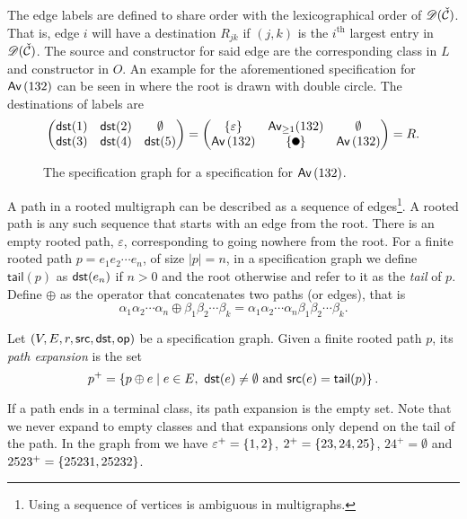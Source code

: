 The edge labels are defined to share order with the lexicographical order of $\mathscr{D}(\check{\mathcal{C}})$. That is, edge $i$ will have a destination $R_{jk}$ if $(j,k)$ is the $i^\text{th}$ largest entry in $\mathscr{D}(\check{\mathcal{C}})$. The source and constructor for said edge are the corresponding class in $L$ and constructor in $O$. An example for the aforementioned specification for $\textsf{Av}\left(132\right)$ can be seen in  where the root is drawn with double circle. The destinations of labels are
\[
    \begin{pmatrix}
        \dst(1) & \dst(2) & \emptyset\\
        \dst(3) & \dst(4) & \dst(5)
    \end{pmatrix}
    =
    \begin{pmatrix}
    \set{\varepsilon} & \textsf{Av}_{\geq1}(132) & \emptyset \\
    \Av{132} & \set{\point{0.1}} & \Av{132}
    \end{pmatrix}
    = R.
\]

\begin{figure}[ht!]
    \centering
    
    \caption{The specification graph for a specification for $\textsf{Av}\left(132\right)$.}
    \label{fig:specgraph132}
\end{figure}

A path in a rooted multigraph can be described as a sequence of edges\footnote{Using a sequence of vertices is ambiguous in multigraphs.}. A rooted path is any such sequence that starts with an edge from the root. There is an empty rooted path, $\varepsilon$, corresponding to going nowhere from the root. For a finite rooted path $p=e_1e_2\dotsm e_n$, of size $|p|=n$, in a specification graph we define $\textsf{tail}(p)$ as $\textsf{dst}(e_n)$ if $n>0$ and the root otherwise and refer to it as the \emph{tail} of $p$. Define $\oplus$ as the operator that concatenates two paths (or edges), that is
\[
    \alpha_1\alpha_2 \dotsm \alpha_n \oplus \beta_1\beta_2 \dotsm \beta_k = \alpha_1\alpha_2 \dotsm \alpha_n\beta_1\beta_2 \dotsm \beta_k.
\]

\begin{definition}
Let $(V,E,r,\textsf{src},\textsf{dst},\textsf{op})$ be a specification graph. Given a finite rooted path $p$, its \emph{path expansion} is the set 
\[
    p^+ = \left\{p \oplus e \mid e \in E, \ \textsf{dst}(e) \neq \emptyset \text{ and } \textsf{src}(e) = \textsf{tail}(p)\right\}.
\]
\end{definition}
If a path ends in a terminal class, its path expansion is the empty set. Note that we never expand to empty classes and that expansions only depend on the tail of the path. In the graph from  we have $\varepsilon^+ = \left\{1,2\right\}$, $2^+ = \left\{23,24,25\right\}$, $24^+ = \emptyset$ and $2523^+ = \left\{25231, 25232\right\}$.


